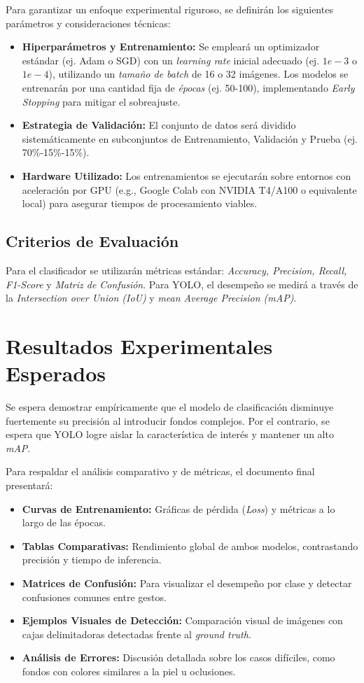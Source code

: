 \documentclass[a4paper,12pt]{article}
\begin{document}
Para garantizar un enfoque experimental riguroso, se definirán los siguientes parámetros y consideraciones técnicas:
\begin{itemize}
    \item \textbf{Hiperparámetros y Entrenamiento:} Se empleará un optimizador estándar (ej. Adam o SGD) con un \textit{learning rate} inicial adecuado (ej. $1e-3$ o $1e-4$), utilizando un \textit{tamaño de batch} de 16 o 32 imágenes. Los modelos se entrenarán por una cantidad fija de \textit{épocas} (ej. 50-100), implementando \textit{Early Stopping} para mitigar el sobreajuste.
    \item \textbf{Estrategia de Validación:} El conjunto de datos será dividido sistemáticamente en subconjuntos de Entrenamiento, Validación y Prueba (ej. 70\%-15\%-15\%).
    \item \textbf{Hardware Utilizado:} Los entrenamientos se ejecutarán sobre entornos con aceleración por GPU (e.g., Google Colab con NVIDIA T4/A100 o equivalente local) para asegurar tiempos de procesamiento viables.
\end{itemize}

\subsection{Criterios de Evaluación}
Para el clasificador se utilizarán métricas estándar: \textit{Accuracy, Precision, Recall, F1-Score} y \textit{Matriz de Confusión}. Para YOLO, el desempeño se medirá a través de la \textit{Intersection over Union (IoU)} y \textit{mean Average Precision (mAP)}.

\section{Resultados Experimentales Esperados}

Se espera demostrar empíricamente que el modelo de clasificación disminuye fuertemente su precisión al introducir fondos complejos. Por el contrario, se espera que YOLO logre aislar la característica de interés y mantener un alto \textit{mAP}.

Para respaldar el análisis comparativo y de métricas, el documento final presentará:
\begin{itemize}
    \item \textbf{Curvas de Entrenamiento:} Gráficas de pérdida (\textit{Loss}) y métricas a lo largo de las épocas.
    \item \textbf{Tablas Comparativas:} Rendimiento global de ambos modelos, contrastando precisión y tiempo de inferencia.
    \item \textbf{Matrices de Confusión:} Para visualizar el desempeño por clase y detectar confusiones comunes entre gestos.
    \item \textbf{Ejemplos Visuales de Detección:} Comparación visual de imágenes con cajas delimitadoras detectadas frente al \textit{ground truth}.
    \item \textbf{Análisis de Errores:} Discusión detallada sobre los casos difíciles, como fondos con colores similares a la piel u oclusiones.
\end{itemize}
\end{document}
